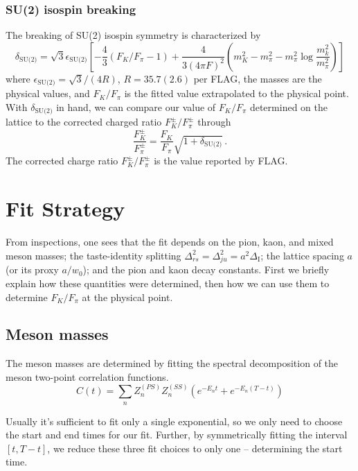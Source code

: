 \documentclass[prd,tightenlines,preprintnumbers,showpacs,superscriptaddress,notitlepage,eqsecnum,floatfix,notitlepage]{revtex4-1}
\begin{document}
\subsubsection{ SU(2) isospin breaking}
The breaking of SU(2) isospin symmetry is characterized by
\begin{equation}
\delta_{\text{SU(2)}} = \sqrt{3} \epsilon_\text{SU(2)} \left[
-\frac43 (F_K / F_\pi-1)
+\frac{4}{3(4 \pi F)^2} \left( m_K^2 - m_\pi^2 -m_\pi^2 \log \frac{m_k^2}{m_\pi^2} \right)
\right]
\end{equation}
where $\epsilon_\text{SU(2)} = \sqrt{3}/(4R)$, $R=35.7(2.6)$ per FLAG, the masses are the physical values, and $F_K/F_\pi$ is the fitted value extrapolated to the physical point. With $\delta_{\text{SU(2)}}$ in hand, we can compare our value of $F_K/F_\pi$ determined on the lattice to the corrected charged ratio $F^\pm_K/F^\pm_\pi$ through
\begin{equation}
\frac{F^\pm_K}{F^\pm_\pi} = \frac{F_K}{F_\pi} \sqrt{1+ \delta_{\text{SU(2)}}} \, .
\end{equation}
The corrected charge ratio $F^\pm_K/F^\pm_\pi$ is the value reported by FLAG.

\section{Fit Strategy}

From inspections, one sees that the fit depends on the pion, kaon, and mixed meson masses; the taste-identity splitting $\Delta_{rs}^2 = \Delta_{ju}^2 = a^2 \Delta_\text{I}$; the lattice spacing $a$ (or its proxy $a/w_0$); and the pion and kaon decay constants. First we briefly explain how these quantities were determined, then how we can use them to determine $F_K / F_\pi$ at the physical point.


\subsection{Meson masses}
The meson masses are determined by fitting the spectral decomposition of the meson two-point correlation functions.
\begin{equation}
C(t) = \sum_n Z^{(PS)}_{n} Z^{(SS)}_{n} \left( e^{-E_n t} + e^{-E_n (T-t)} \right)
\label{eqn:meson-correlation-fcn}
\end{equation}

Usually it's sufficient to fit only a single exponential, so we only need to choose the start and end times for our fit. Further, by symmetrically fitting the interval $[t, T - t]$, we reduce these three fit choices to only one -- determining the start time.
\end{document}
